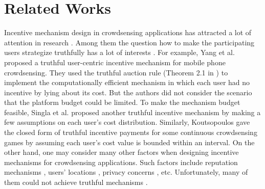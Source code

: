 \documentclass[conference]{IEEEtran}
\theoremstyle{definition}
\begin{document}
%

\section{Related Works}
\label{sec:rw}
Incentive mechanism design in crowdsensing applications has attracted a lot of attention in research \cite{ganti2011mobile, singer2013pricing, vukovic2010ubiquitous, yang2012crowdsourcing, zhao2012evaluation, koutsopoulos2013optimal, zhang2012reputation, singla2013truthful, jaimes2012location, singla2013incentives}. Among them the question how to make the participating users strategize truthfully has a lot of interests \cite{singer2013pricing, vukovic2010ubiquitous}. For example, Yang et al. \cite{yang2012crowdsourcing} proposed a truthful user-centric incentive mechanism for mobile phone crowdsensing. They used the truthful auction rule (Theorem 2.1 in \cite{singer2010budget}) to implement the computationally efficient mechanism in which each user had no incentive by lying about its cost. But the authors did not consider the scenario that the platform budget could be limited. To make the mechanism budget feasible, Singla et al. \cite{singla2013truthful} proposed another truthful incentive mechanism by making a few assumptions on each user's cost distribution. Similarly, Koutsopoulos \cite{koutsopoulos2013optimal} gave the closed form of truthful incentive payments for some continuous crowdsensing games by assuming each user's cost value is bounded within an interval. On the other hand, one may consider many other factors when designing incentive mechanisms for crowdsensing applications. Such factors include reputation mechanisms \cite{zhang2012reputation}, users' locations \cite{jaimes2012location}, privacy concerns \cite{singla2013incentives}, etc. Unfortunately, many of them could not achieve truthful mechanisms \cite{zhang2012reputation, jaimes2012location}.
\end{document}
